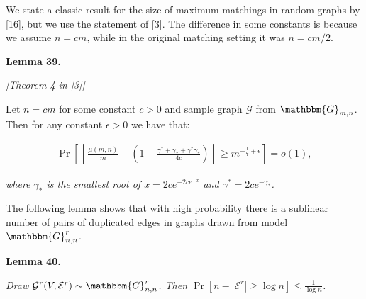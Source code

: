 \documentclass[10pt,a4paper]{article}
\begin{document}



We state a classic result for the size of maximum matchings in random graphs by [16], but we use the statement of [3]. The difference in some constants is because we assume $n=cm$, while in the original matching setting it was $n=cm/2$.\par





\par\medskip\noindent\textbf{\textbf{Lemma 39}\textbf{.}}\par



{\itshape [Theorem 4 in [3]]

Let $n=cm$ for some constant $c>0$ and sample graph $\mathcal{G}$ from $\mathbbm{G}_{m,n}$.
Then for any constant $\epsilon>0$ we have that:}\par


\[\begin{gathered}
\displaystyle\Pr\left[\middle|\frac{\mu(m,n)}{m}-\left(1-\frac{\gamma^{*}+\gamma_{*}+\gamma^{*}\gamma_{*}}{4c}\right)\middle|\geq m^{-\frac{1}{7}+\epsilon}\right]=o(1),
\end{gathered}\]


\emph{where $\gamma_{*}$ is the smallest root of $x=2ce^{-2ce^{-x}}$ and $\gamma^{*}=2ce^{-\gamma_{*}}$.}\par






The following lemma shows that with high probability there is a sublinear number of pairs of duplicated edges in graphs drawn from model $\mathbbm{G}^{r}_{n,n}$.\par





\par\medskip\noindent\textbf{\textbf{Lemma 40}\textbf{.}}\par



\emph{Draw $\mathcal{G}^{r}(V,\mathcal{E}^{r})\sim\mathbbm{G}^{r}_{n,n}$.
Then $\Pr\left[n-|\mathcal{E}^{r}|\geq\log{n}\right]\leq\frac{1}{\log{n}}$.}\par



\end{document}

